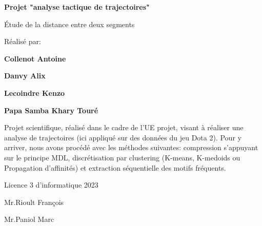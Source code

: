 \begin{titlepage}
\begin{Large}    
\vfill
\noindent \textbf{\LARGE Projet "analyse tactique de trajectoires"}%

\noindent Étude de la distance entre deux segments

\vspace*{1cm}

{\noindent \large Réalisé par:}


\textbf{\large{ Collenot Antoine }}

\textbf{\large{ Danvy Alix }}

\textbf{\large{ Lecoindre Kenzo }}

\textbf{\large{ Papa Samba Khary Touré }}


\vspace*{2cm}


\noindent \large Projet scientifique, réalisé dans le cadre de l'UE projet, visant à réaliser une analyse de trajectoires (ici appliqué sur des données du jeu Dota 2). Pour y arriver, nous avons procédé avec les méthodes suivantes: compression s'appuyant sur le principe MDL, discrétisation par clustering (K-means, K-medoids ou Propagation d'affinités) et extraction séquentielle des motifs fréquents.
\\



\vspace*{5cm}




\noindent  Licence 3 d'informatique 2023

\vspace*{1cm}


Mr.Rioult François

Mr.Paniol Marc


\end{Large}
\end{titlepage}
